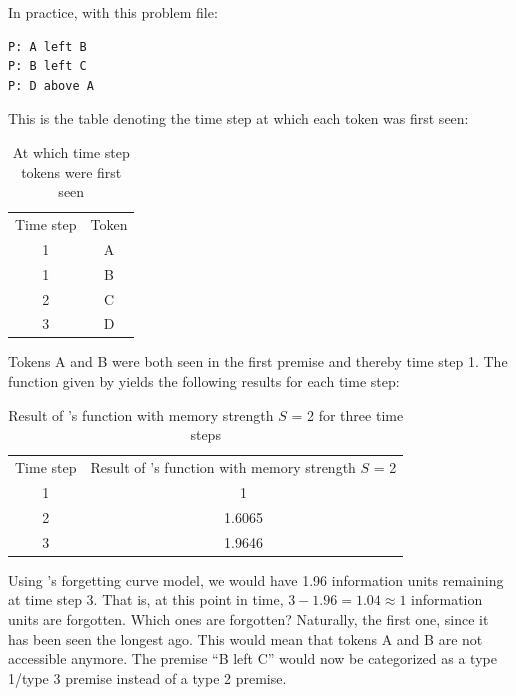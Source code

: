 \documentclass[hidelinks]{scrartcl}
\begin{document}
In practice, with this problem file:

\begin{lstlisting}[caption=Problem file, frame=single]
P: A left B
P: B left C
P: D above A
\end{lstlisting}

This is the table denoting the time step at which each token was first seen:

\begin{table}[H]
	\begin{tabular}{| c c |}
	\hline
	Time step 	& Token \\
	1			& A		\\
	1			& B		\\
	2			& C		\\
	3			& D		\\
	\hline
	\end{tabular}
	\caption{At which time step tokens were first seen}
\end{table}

Tokens A and B were both seen in the first premise and thereby time step 1. The function given by \cite{Yffelti.2016} yields the following results for each time step:

\begin{table}[H]
	\begin{tabular}{| c c |}
	\hline
	Time step 	& Result of \cite{Yffelti.2016}'s function with memory strength $S$ = 2	\\
	1			& 1											\\
	2			& 1.6065									\\
	3			& 1.9646									\\
	\hline
	\end{tabular}
	\caption{Result of \cite{Yffelti.2016}'s function with memory strength $S$ = 2 for three time steps}
\end{table}

Using \cite{Yffelti.2016}'s forgetting curve model, we would have 1.96 information units remaining at time step 3. That is, at this point in time, $3 - 1.96 = 1.04 \approx 1$ information units are forgotten. Which ones are forgotten? Naturally, the first one, since it has been seen the longest ago. This would mean that tokens A and B are not accessible anymore. The premise ``B left C'' would now be categorized as a type 1/type 3 premise instead of a type 2 premise.
\end{document}
